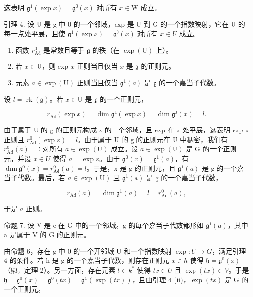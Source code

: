 这表明 \(\mathfrak{g}^1 (\exp x) = \mathfrak{g}^0 (x)\) 对所有 \(x\in \mathrm{W}\) 成立。

引理 4. 设 U 是 g 中 0 的一个邻域，exp 是 U 到 G 的一个指数映射，它在 U 的每一点处平展，且使 \(\mathfrak{g}^{1}(\exp x) = \mathfrak{g}^{0}(x)\) 对所有 \(x \in U\) 成立。

\begin{enumerate}
\def\labelenumi{(\roman{enumi})}
\item
  函数 \(r_{\mathrm{Ad}}^0\) 是常数且等于 \(\mathfrak{g}\) 的秩（在 \(\exp(\mathrm{U})\) 上）。
\item
  若 \(x \in \mathrm{U}\)，则 exp \(x\) 正则当且仅当 \(x\) 是 \(\mathfrak{g}\) 的正则元。
\item
  元素 \(a \in \exp(\mathrm{U})\) 正则当且仅当 \(\mathfrak{g}^1(a)\) 是 \(\mathfrak{g}\) 的一个嘉当子代数。
\end{enumerate}

设 \(l = \operatorname{rk}(\mathfrak{g})\)。若 \(x \in \mathrm{U}\) 是 \(\mathfrak{g}\) 的一个正则元，

\[
r _ {\mathrm{Ad}} (\exp x) = \dim \mathfrak {g} ^ {1} (\exp x) = \dim \mathfrak {g} ^ {0} (x) = l.
\]

由于属于 U 的 g 的正则元构成 x 的一个邻域，且 exp 在 x 处平展，这表明 exp x 正则且 \(r_{\mathrm{Ad}}^{0}(\exp x) = l\)。由于属于 U 的 g 的正则元在 U 中稠密，我们有 \(r_{\mathrm{Ad}}^{0}(a) = l\) 对所有 \(a \in \exp(\mathrm{U})\) 成立。设 \(a \in \exp(\mathrm{U})\) 是 G 的一个正则元，并设 \(x \in U\) 使得 \(a = \exp x\)。由于 \(\mathfrak{g}^{0}(x) = \mathfrak{g}^{1}(a)\)，有 \(\dim \mathfrak{g}^{0}(x) = r_{\mathrm{Ad}}^{0}(a) = l\)。于是，x 是 g 的正则元，且 \(\mathfrak{g}^{1}(a)\) 是 g 的一个嘉当子代数。最后，若 \(a \in \exp(\mathrm{U})\) 且 \(\mathfrak{g}^{1}(a)\) 是 g 的一个嘉当子代数，

\[
r _ {\mathrm{Ad}} (a) = \dim \mathfrak {g} ^ {1} (a) = l = r _ {\mathrm{Ad}} ^ {0} (a),
\]

于是 \(a\) 正则。

命题 7. 设 V 是 e 在 G 中的一个邻域。g 的每个嘉当子代数都形如 \(\mathfrak{g}^{1}(a)\)，其中 a 是属于 V 的 G 的正则元。

由命题 6，存在 g 中 0 的一个开邻域 U 和一个指数映射 \(\exp: U \to G\)，满足引理 4 的条件。若 h 是 g 的一个嘉当子代数，则存在正则元 \(x \in h\) 使得 \(\mathfrak{h} = \mathfrak{g}^{0}(x)\)（§3，定理 2）。另一方面，存在元素 \(t \in k^{*}\) 使得 \(tx \in U\) 且 \(\exp(tx) \in V\)。于是 \(\mathfrak{h} = \mathfrak{g}^{0}(x) = \mathfrak{g}^{0}(tx) = \mathfrak{g}^{1}(\exp(tx))\)，且由引理 4 (ii)，\(\exp(tx)\) 是 G 的一个正则元。

